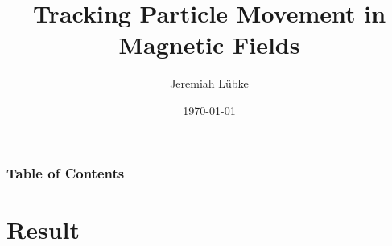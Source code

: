 \documentclass[mathserif]{beamer}
\title{Tracking Particle Movement in Magnetic Fields}
\author{Jeremiah Lübke}
\date{\today}
\begin{document}
\frame{\titlepage}

\begin{frame}
    \frametitle{Table of Contents}
    \tableofcontents
\end{frame}





\section{Result}






\end{document}
